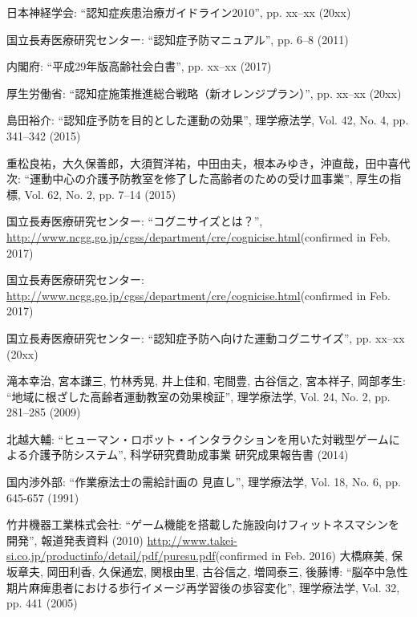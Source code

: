 \thispagestyle{myheadings}
\markright{}
\def\bibname{参考文献}
\begin{thebibliography}{20}


日本神経学会: ``認知症疾患治療ガイドライン2010'', pp. xx--xx (20xx)

国立長寿医療研究センター: ``認知症予防マニュアル'', pp. 6--8 (2011)

内閣府: ``平成29年版高齢社会白書'', pp. xx--xx (2017)

厚生労働省: ``認知症施策推進総合戦略（新オレンジプラン）'', pp. xx--xx (20xx)

島田裕介: ``認知症予防を目的とした運動の効果'', 理学療法学, Vol. 42, No. 4, pp. 341--342 (2015)

重松良祐，大久保善郎，大須賀洋祐，中田由夫，根本みゆき，沖直哉，田中喜代次: ``運動中心の介護予防教室を修了した高齢者のための受け皿事業'', 厚生の指標, Vol. 62, No. 2, pp. 7--14 (2015)

国立長寿医療研究センター: ``コグニサイズとは？'', \url{http://www.ncgg.go.jp/cgss/department/cre/cognicise.html}(confirmed in Feb. 2017)

国立長寿医療研究センター: \url{http://www.ncgg.go.jp/cgss/department/cre/cognicise.html}(confirmed in Feb. 2017)

国立長寿医療研究センター: ``認知症予防へ向けた運動コグニサイズ'', pp. xx--xx (20xx)

滝本幸治, 宮本謙三, 竹林秀晃, 井上佳和, 宅間豊, 古谷信之, 宮本祥子, 岡部孝生: ``地域に根ざした高齢者運動教室の効果検証'', 理学療法学, Vol. 24, No. 2, pp. 281--285 (2009)

北越大輔: ``ヒューマン・ロボット・インタラクションを用いた対戦型ゲームによる介護予防システム'', 科学研究費助成事業 研究成果報告書 (2014)

国内渉外部: ``作業療法士の需給計画の 見直し'', 理学療法学, Vol. 18, No. 6, pp. 645-657 (1991)

竹井機器工業株式会社: ``ゲーム機能を搭載した施設向けフィットネスマシンを開発'', 報道発表資料 (2010)
\url{http://www.takei-si.co.jp/productinfo/detail/pdf/puresu.pdf}(confirmed in Feb. 2016)
大橋麻美, 保坂章夫, 岡田利香, 久保通宏, 関根由里, 古谷信之, 増岡泰三, 後藤博: ``脳卒中急性期片麻痺患者における歩行イメージ再学習後の歩容変化'', 理学療法学, Vol. 32,  pp. 441 (2005)


\end{thebibliography}
